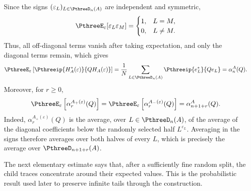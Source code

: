 \documentclass[11pt,reqno]{amsart}
\makeatletter
\theoremstyle{plain}
\theoremstyle{definition}
\newcounter{problempaper}
\newenvironment{problempaperbody}{%
  \setcounter{subsection}{0}%
  \setcounter{subsubsection}{0}%
  \setcounter{paragraph}{0}%
  \renewcommand{\thesubsection}{\arabic{subsection}}%
  \renewcommand{\thesubsubsection}{\thesubsection.\arabic{subsubsection}}%
  \renewcommand{\theparagraph}{\thesubsubsection.\arabic{paragraph}}%
  \let\problem@outersection\section
  \let\problem@outersubsection\subsection
  \let\problem@outersubsubsection\subsubsection
  \let\problem@outerparagraph\paragraph
  \let\section\problem@papersection
  \let\subsection\problem@papersubsection
  \let\subsubsection\problem@papersubsubsection
}{%
  \let\section\problem@outersection
  \let\subsection\problem@outersubsection
  \let\subsubsection\problem@outersubsubsection
  \let\paragraph\problem@outerparagraph
}
\newcommand{\problem@target}[2]{%
  \hypertarget{problem-\theproblempaper-#1-#2}{}%
}
\newcommand{\problem@paperheading}[3]{%
  \par\bigskip
  \problem@target{#1}{#2}%
  \noindent{\large\bfseries #2.\quad #3\par}%
  \nobreak\smallskip
}
\newcommand{\problem@papersubheading}[3]{%
  \par\medskip
  \problem@target{#1}{#2}%
  \noindent{\normalsize\bfseries #2.\quad #3\par}%
  \nobreak\smallskip
}
\newcommand{\problem@papersubsubheading}[3]{%
  \par\smallskip
  \problem@target{#1}{#2}%
  \noindent{\normalsize\itshape #2.\quad #3.\ }%
}
\def\problem@papersection{%
  \@ifstar{\problem@papersectionstar}{\problem@papersectionnostar}%
}
\def\problem@papersectionstar#1{%
  \par\bigskip\noindent{\large\bfseries #1\par}\nobreak\smallskip
}
\def\problem@papersectionnostar#1{%
  \refstepcounter{subsection}%
  \setcounter{subsubsection}{0}%
  \setcounter{paragraph}{0}%
  \problem@paperheading{section}{\thesubsection}{#1}%
  \problem@writecontentsline{section}{\thesubsection}{#1}%
}
\def\problem@papersubsection{%
  \@ifstar{\problem@papersubsectionstar}{\problem@papersubsectionnostar}%
}
\def\problem@papersubsectionstar#1{%
  \par\medskip\noindent{\normalsize\bfseries #1\par}\nobreak\smallskip
}
\def\problem@papersubsectionnostar#1{%
  \refstepcounter{subsubsection}%
  \setcounter{paragraph}{0}%
  \problem@papersubheading{subsection}{\thesubsubsection}{#1}%
  \problem@writecontentsline{subsection}{\thesubsubsection}{#1}%
}
\def\problem@papersubsubsection{%
  \@ifstar{\problem@papersubsubsectionstar}{\problem@papersubsubsectionnostar}%
}
\def\problem@papersubsubsectionstar#1{%
  \par\smallskip\noindent{\normalsize\itshape #1.\ }%
}
\def\problem@papersubsubsectionnostar#1{%
  \refstepcounter{paragraph}%
  \problem@papersubsubheading{subsubsection}{\theparagraph}{#1}%
  \problem@writecontentsline{subsubsection}{\theparagraph}{#1}%
}
\newcommand{\problem@writecontentsline}[3]{%
  \begingroup
  \protected@write\@auxout{}{%
    \string\problemcontentsentry{\theproblempaper}{#1}{#2}{#3}{\thepage}%
  }%
  \endgroup
}
\newcommand{\problemcontentsentry}[5]{%
  \@ifundefined{problemcontents@#1}{%
    \expandafter\gdef\csname problemcontents@#1\endcsname{}%
  }{}%
  \expandafter\g@addto@macro\csname problemcontents@#1\endcsname{%
    \problemcontentsline{#1}{#2}{#3}{#4}{#5}%
  }%
}
\newcommand{\problemcontentslink}[4]{%
  \hyperlink{problem-#1-#2-#3}{#4}%
}
\newcommand{\problemcontentsline}[5]{%
  \ifstrequal{#2}{section}{%
    \par\noindent
    \problemcontentslink{#1}{#2}{#3}{\makebox[2.5em][l]{#3}#4}%
    \nobreak\dotfill
    \problemcontentslink{#1}{#2}{#3}{#5}\par
  }{%
    \ifstrequal{#2}{subsection}{%
      \par\noindent\hspace*{1.5em}%
      \problemcontentslink{#1}{#2}{#3}{\makebox[3.5em][l]{#3}#4}%
      \nobreak\dotfill
      \problemcontentslink{#1}{#2}{#3}{#5}\par
    }{%
      \par\noindent\hspace*{3em}%
      \problemcontentslink{#1}{#2}{#3}{\makebox[4.5em][l]{#3}#4}%
      \nobreak\dotfill
      \problemcontentslink{#1}{#2}{#3}{#5}\par
    }%
  }%
}
\makeatother
\begin{document}
\begin{problempaperbody}
\begin{equation*}
\end{equation*}
Since the signs $(\varepsilon_L)_{L\in\PthreeD_n(A)}$ are independent and symmetric,
\begin{equation*}
        \PthreeE_\varepsilon[\varepsilon_L\varepsilon_M]=\begin{cases}1, & L=M,\\ 0, & L\neq M.\end{cases}
\end{equation*}
Thus, all off-diagonal terms vanish after taking expectation, and only the diagonal terms remain, which gives
\begin{equation}
\label{p3:eq:outer-random-block-expectation}
        \PthreeE_\varepsilon\left[\Pthreeip{H_A^*(\varepsilon)}{QH_A(\varepsilon)}\right]=\frac1N\sum_{L\in\PthreeD_n(A)}\Pthreeip{e_L^*}{Qe_L}=\alpha_n^A(Q).
\end{equation}
Moreover, for $r\geq0$,
\begin{equation}
\label{p3:eq:child-trace-expectation}
        \PthreeE_\varepsilon\left[\alpha_r^{A_+(\varepsilon)}(Q)\right]=\PthreeE_\varepsilon\left[\alpha_r^{A_-(\varepsilon)}(Q)\right]=\alpha_{n+1+r}^A(Q).
\end{equation}
Indeed, $\alpha_r^{A_+(\varepsilon)}(Q)$ is the average, over $L\in\PthreeD_n(A)$, of the average of the diagonal coefficients below the randomly selected half $L^{\varepsilon_L}$. Averaging in the signs therefore averages over both halves of every $L$, which is precisely the average over $\PthreeD_{n+1+r}(A)$.

The next elementary estimate says that, after a sufficiently fine random split, the child traces concentrate around their expected values. This is the probabilistic result used later to preserve infinite tails through the construction.


\end{problempaperbody}
\end{document}
